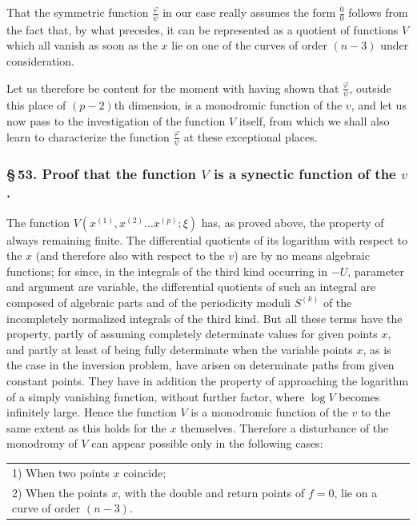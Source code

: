 \documentclass[10pt]{article}
\begin{document}
That the symmetric function \(\frac{\varphi}{\psi}\) in our case really assumes the form \(\frac00\) follows from the fact that, by what precedes, it can be represented as a quotient of functions \(V\) which all vanish as soon as the \(x\) lie on one of the curves of order \((n-3)\) under consideration.

Let us therefore be content for the moment with having shown that \(\frac{\varphi}{\psi}\), outside this place of \((p-2)\)th dimension, is a monodromic function of the \(v\), and let us now pass to the investigation of the function \(V\) itself, from which we shall also learn to characterize the function \(\frac{\varphi}{\psi}\) at these exceptional places.

\subsubsection*{\S\,53. Proof that the function \(V\) is a synectic function of the \(v\).}

The function \(V(x^{(1)},x^{(2)}\ldots x^{(p)};\xi)\) has, as proved above, the property of always remaining finite. The differential quotients of its logarithm with respect to the \(x\) (and therefore also with respect to the \(v\)) are by no means algebraic functions; for since, in the integrals of the third kind occurring in \(-U\), parameter and argument are variable, the differential quotients of such an integral are composed of algebraic parts and of the periodicity moduli \(S^{(k)}\) of the incompletely normalized integrals of the third kind. But all these terms have the property, partly of assuming completely determinate values for given points \(x\), and partly at least of being fully determinate when the variable points \(x\), as is the case in the inversion problem, have arisen on determinate paths from given constant points. They have in addition the property of approaching the logarithm of a simply vanishing function, without further factor, where \(\log V\) becomes infinitely large. Hence the function \(V\) is a monodromic function of the \(v\) to the same extent as this holds for the \(x\) themselves. Therefore a disturbance of the monodromy of \(V\) can appear possible only in the following cases:

\begin{center}
\begin{tabular}{@{}p{5.15in}@{}}
1) When two points \(x\) coincide;\\
2) When the points \(x\), with the double and return points of \(f=0\), lie on a curve of order \((n-3)\).
\end{tabular}
\end{center}
\end{document}

